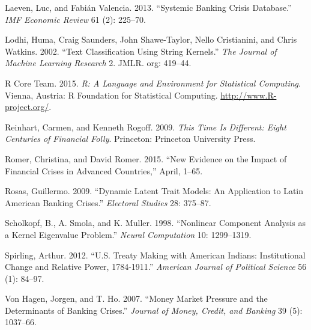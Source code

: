 \documentclass[]{article}
\begin{document}
Laeven, Luc, and Fabi{á}n Valencia. 2013. ``Systemic Banking Crisis
Database.'' \emph{IMF Economic Review} 61 (2): 225--70.

Lodhi, Huma, Craig Saunders, John Shawe-Taylor, Nello Cristianini, and
Chris Watkins. 2002. ``Text Classification Using String Kernels.''
\emph{The Journal of Machine Learning Research} 2. JMLR. org: 419--44.

R Core Team. 2015. \emph{R: A Language and Environment for Statistical
Computing}. Vienna, Austria: R Foundation for Statistical Computing.
\url{http://www.R-project.org/}.

Reinhart, Carmen, and Kenneth Rogoff. 2009. \emph{This Time Is
Different: Eight Centuries of Financial Folly}. Princeton: Princeton
University Press.

Romer, Christina, and David Romer. 2015. ``New Evidence on the Impact of
Financial Crises in Advanced Countries,'' April, 1--65.

Rosas, Guillermo. 2009. ``Dynamic Latent Trait Models: An Application to
Latin American Banking Crises.'' \emph{Electoral Studies} 28: 375--87.

Scholkopf, B., A. Smola, and K. Muller. 1998. ``Nonlinear Component
Analysis as a Kernel Eigenvalue Problem.'' \emph{Neural Computation} 10:
1299--1319.

Spirling, Arthur. 2012. ``U.S. Treaty Making with American Indians:
Institutional Change and Relative Power, 1784-1911.'' \emph{American
Journal of Political Science} 56 (1): 84--97.

{Von Hagen}, Jorgen, and T. Ho. 2007. ``Money Market Pressure and the
Determinants of Banking Crises.'' \emph{Journal of Money, Credit, and
Banking} 39 (5): 1037--66.
\end{document}
